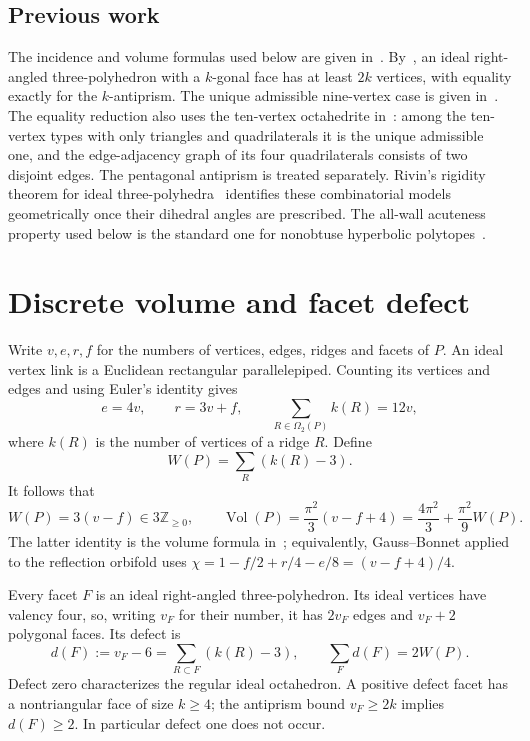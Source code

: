\documentclass[11pt]{article}
\theoremstyle{remark}
\newcommand{\Vol}{\operatorname{Vol}}
\begin{document}
\subsection{Previous work}
The incidence and volume formulas used below are given
in~\cite[Lemmas~1--2]{Kolpakov}. By~\cite[Proposition~5]{Kolpakov},
an ideal right-angled three-polyhedron with a $k$-gonal face has
at least $2k$ vertices, with equality exactly for the $k$-antiprism.
The unique admissible nine-vertex case is given
in~\cite[Section~4.3, Case~D and Figure~6]{Kolpakov}. The equality
reduction also uses the ten-vertex octahedrite
in~\cite[Figure~7]{Kolpakov}: among the
ten-vertex types with only triangles and quadrilaterals it is the
unique admissible one, and the edge-adjacency graph of its four
quadrilaterals consists of two disjoint edges. The pentagonal
antiprism is treated separately. Rivin's rigidity theorem for ideal
three-polyhedra~\cite{Rivin} identifies these combinatorial models
geometrically once their dihedral angles are prescribed. The
all-wall acuteness property used below is the standard one for
nonobtuse hyperbolic polytopes~\cite[\S2.1]{Vinberg}.

\section{Discrete volume and facet defect}\label{sec:defect}
Write $v,e,r,f$ for the numbers of vertices, edges, ridges and facets of
$P$. An ideal vertex link is a Euclidean rectangular parallelepiped. Counting
its vertices and edges and using Euler's identity gives
\[
 e=4v,\qquad r=3v+f,\qquad
 \sum_{R\in\Omega_2(P)} k(R)=12v,
\]
where $k(R)$ is the number of vertices of a ridge $R$. Define
\[
 W(P)=\sum_R(k(R)-3).
\]
It follows that
\begin{equation}\label{eq:discrete}
 W(P)=3(v-f)\in3\mathbb Z_{\ge0},\qquad
 \Vol(P)=\frac{\pi^2}{3}(v-f+4)
 =\frac{4\pi^2}{3}+\frac{\pi^2}{9}W(P).
\end{equation}
The latter identity is the volume formula in~\cite{Kolpakov}; equivalently,
Gauss--Bonnet applied to the reflection orbifold uses
$\chi=1-f/2+r/4-e/8=(v-f+4)/4$.

Every facet $F$ is an ideal right-angled three-polyhedron. Its ideal
vertices have valency four, so, writing $v_F$ for their number, it has
$2v_F$ edges and $v_F+2$ polygonal faces. Its defect is
\begin{equation}\label{eq:facet}
 d(F):=v_F-6=\sum_{R\subset F}(k(R)-3),\qquad
 \sum_F d(F)=2W(P).
\end{equation}
Defect zero characterizes the regular ideal octahedron. A positive
defect facet has a nontriangular face of size $k\ge4$; the antiprism
bound $v_F\ge2k$ implies $d(F)\ge2$. In particular defect one does not
occur.
\end{document}
